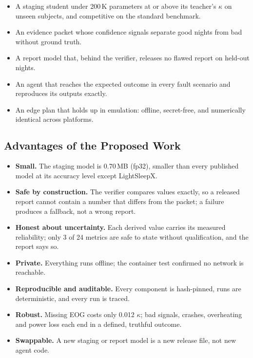 \begin{itemize}
  \item A staging student under 200\,K parameters at or above its teacher's $\kappa$ on unseen subjects, and
  competitive on the standard benchmark.
  \item An evidence packet whose confidence signals separate good nights from bad without ground truth.
  \item A report model that, behind the verifier, releases no flawed report on held-out nights.
  \item An agent that reaches the expected outcome in every fault scenario and reproduces its outputs exactly.
  \item An edge plan that holds up in emulation: offline, secret-free, and numerically identical across platforms.
\end{itemize}

\subsection{Advantages of the Proposed Work}

\begin{itemize}
  \item \textbf{Small.} The staging model is 0.70\,MB (fp32), smaller than every published model at its accuracy
  level except LightSleepX.
  \item \textbf{Safe by construction.} The verifier compares values exactly, so a released report cannot contain a
  number that differs from the packet; a failure produces a fallback, not a wrong report.
  \item \textbf{Honest about uncertainty.} Each derived value carries its measured reliability; only 3 of 24 metrics
  are safe to state without qualification, and the report says so.
  \item \textbf{Private.} Everything runs offline; the container test confirmed no network is reachable.
  \item \textbf{Reproducible and auditable.} Every component is hash-pinned, runs are deterministic, and every run
  is traced.
  \item \textbf{Robust.} Missing EOG costs only 0.012 $\kappa$; bad signals, crashes, overheating and power loss each
  end in a defined, truthful outcome.
  \item \textbf{Swappable.} A new staging or report model is a new release file, not new agent code.
\end{itemize}

